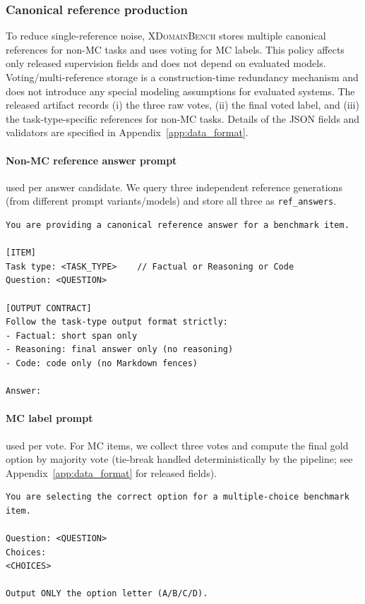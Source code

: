 \subsubsection{Canonical reference production}
\label{app:prompts_reference_answers}

To reduce single-reference noise, \textsc{XDomainBench} stores multiple canonical references for non-MC tasks and uses voting for MC labels.
This policy affects only released supervision fields and does not depend on evaluated models. Voting/multi-reference storage is a construction-time redundancy mechanism and does not introduce any special modeling assumptions for evaluated systems. The released artifact records (i) the three raw votes, (ii) the final voted label, and (iii) the task-type-specific references for non-MC tasks. Details of the JSON fields and validators are specified in Appendix~\ref{app:data_format}.
\paragraph{Non-MC reference answer prompt} used per answer candidate.
We query three independent reference generations (from different prompt variants/models) and store all three as \texttt{ref\_answers}.
\\
\begin{lstlisting}[frame=single]
You are providing a canonical reference answer for a benchmark item.

[ITEM]
Task type: <TASK_TYPE>    // Factual or Reasoning or Code
Question: <QUESTION>

[OUTPUT CONTRACT]
Follow the task-type output format strictly:
- Factual: short span only
- Reasoning: final answer only (no reasoning)
- Code: code only (no Markdown fences)

Answer:
\end{lstlisting}

\paragraph{MC label prompt} used per vote.
For MC items, we collect three votes and compute the final gold option by majority vote (tie-break handled deterministically by the pipeline; see Appendix~\ref{app:data_format} for released fields).
\\
\begin{lstlisting}[frame=single]
You are selecting the correct option for a multiple-choice benchmark item.

Question: <QUESTION>
Choices:
<CHOICES>

Output ONLY the option letter (A/B/C/D).
\end{lstlisting}

